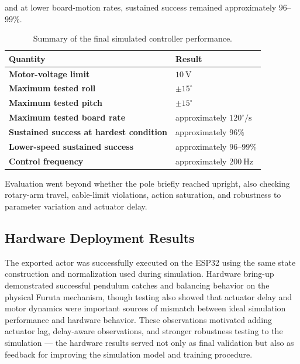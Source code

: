 \documentclass[9pt]{extarticle}
\begin{document}
and at lower board-motion rates, sustained success remained approximately
$96$--$99\%$.

\begin{table}[h]
\centering
\small
\caption{Summary of the final simulated controller performance.}
\begin{tabularx}{0.82\linewidth}{>{\bfseries}X X}
\toprule
Quantity & Result \\
\midrule
Motor-voltage limit & $10~\mathrm{V}$ \\
Maximum tested roll & $\pm15^\circ$ \\
Maximum tested pitch & $\pm15^\circ$ \\
Maximum tested board rate & approximately $120^\circ/\mathrm{s}$ \\
Sustained success at hardest condition & approximately $96\%$ \\
Lower-speed sustained success & approximately $96$--$99\%$ \\
Control frequency & approximately $200~\mathrm{Hz}$ \\
\bottomrule
\end{tabularx}
\end{table}

Evaluation went beyond whether the pole briefly reached upright, also
checking rotary-arm travel, cable-limit violations, action saturation, and
robustness to parameter variation and actuator delay.

\subsection{Hardware Deployment Results}

The exported actor was successfully executed on the ESP32 using the same
state construction and normalization used during simulation. Hardware
bring-up demonstrated successful pendulum catches and balancing behavior on
the physical Furuta mechanism, though testing also showed that actuator
delay and motor dynamics were important sources of mismatch between ideal
simulation performance and hardware behavior. These observations motivated
adding actuator lag, delay-aware observations, and stronger robustness
testing to the simulation — the hardware results served not only as final
validation but also as feedback for improving the simulation model and
training procedure.


\end{document}
